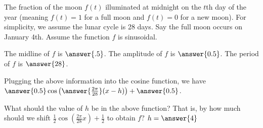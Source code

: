 \documentclass{ximera}
\author{Kenneth Berglund}
\begin{document}
\begin{exercise}
The fraction of the moon $f(t)$ illuminated at midnight on the $t$th day of the year (meaning $f(t) = 1$ for a full moon and $f(t) = 0$ for a new moon). For simplicity, we assume the lunar cycle is 28 days. Say the full moon occurs on January 4th. Assume the function $f$ is sinusoidal. 

The midline of $f$ is $\answer{.5}$. The amplitude of $f$ is $\answer{0.5}$. The period of $f$ is $\answer{28}$. 

\begin{exercise}
Plugging the above information into the cosine function, we have $\answer{0.5}\cos\left(\answer{\frac{2\pi}{28}}(x - h)\right) + \answer{0.5}$.

\begin{exercise}
What should the value of $h$ be in the above function? That is, by how much should we shift $\frac{1}{2}\cos\left(\frac{2\pi}{28}x \right) + \frac{1}{2}$ to obtain $f$? $h = \answer{4}$
\end{exercise}

\end{exercise}

\end{exercise}
\end{document}
